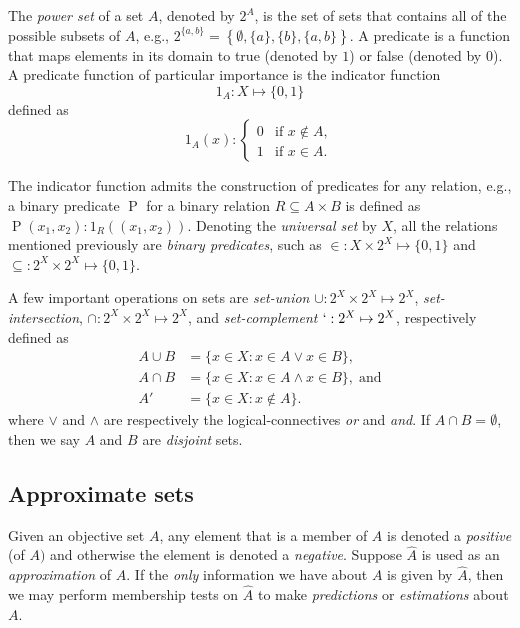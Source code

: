 \documentclass[
]{article}
\begin{document}
The \emph{power set} of a set \(A\), denoted by \(2^A\), is the set of
sets that contains all of the possible subsets of \(A\), e.g.,
\(2^{\{a, b\}} = \left\{ \emptyset, \{a\}, \{b\}, \{a, b\} \right\}\). A
predicate is a function that maps elements in its domain to true
(denoted by \(1\)) or false (denoted by \(0\)). A predicate function of
particular importance is the indicator function \begin{equation}
    1_A : X \mapsto \{0,1\}
\end{equation} defined as \begin{equation}
    1_A(x) :
    \begin{cases}
        0 & \text{if $x \notin A$},\\
        1 & \text{if $x \in A$}.
    \end{cases}
\end{equation}

The indicator function admits the construction of predicates for any
relation, e.g., a binary predicate \(\operatorname{P}\) for a binary
relation \(R \subseteq A \times B\) is defined as
\(\operatorname{P}(x_1,x_2) : 1_{R}((x_1,x_2))\). Denoting the
\emph{universal set} by \(X\), all the relations mentioned previously
are \emph{binary predicates}, such as
\(\in : X \times 2^X \mapsto \{0,1\}\) and
\(\subseteq : 2^X \times 2^X \mapsto \{0,1\}\).

A few important operations on sets are \emph{set-union}
\(\cup : 2^X \times 2^X \mapsto 2^X\), \emph{set-intersection},
\(\cap : 2^X \times 2^X \mapsto 2^X\), and \emph{set-complement}
\(` : 2^X \mapsto 2^X\), respectively defined as \begin{align}
    A \cup B    &= \{ x \in X : x \in A \lor x \in B\},\\
    A \cap B    &= \{ x \in X : x \in A \land x \in B\},\;\text{and}\\
    A'          &= \{ x \in X : x \notin A\}.
\end{align} where \(\lor\) and \(\land\) are respectively the
logical-connectives \emph{or} and \emph{and}. If
\(A \cap B = \emptyset\), then we say \(A\) and \(B\) are
\emph{disjoint} sets.

\hypertarget{sec:asets}{%
\subsection{Approximate sets}\label{sec:asets}}

Given an objective set \(A\), any element that is a member of \(A\) is
denoted a \emph{positive} (of \(A)\) and otherwise the element is
denoted a \emph{negative}. Suppose \(\hat{A}\) is used as an
\emph{approximation} of \(A\). If the \emph{only} information we have
about \(A\) is given by \(\hat{A}\), then we may perform membership
tests on \(\hat{A}\) to make \emph{predictions} or \emph{estimations}
about \(A\).
\end{document}
